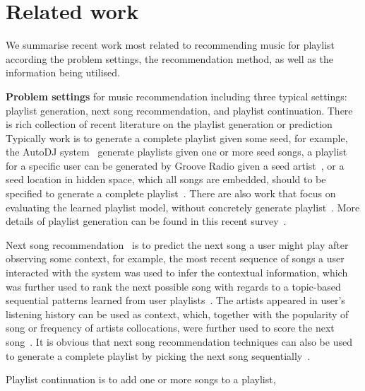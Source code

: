\section{Related work}
\label{sec:related}

We summarise recent work most related to recommending music for playlist
according the problem settings, the recommendation method,
as well as the information being utilised.


{\bf Problem settings} for music recommendation including three typical settings:
playlist generation, next song recommendation, and playlist continuation.
%
There is rich collection of recent literature on the playlist generation 
or prediction~\cite{platt2002learning,mcfee2011natural,mcfee2012hypergraph,chen2012playlist,ben2017groove} 
%
Typically work is to generate a complete playlist given some seed,
for example, the AutoDJ system~\cite{platt2002learning} generate playlists given one or more seed songs,
a playlist for a specific user can be generated by Groove Radio given a seed artist~\cite{ben2017groove},
or a seed location in hidden space, which all songs are embedded, 
should to be specified to generate a complete playlist~\cite{chen2012playlist}.
%
There are also work that focus on evaluating the learned playlist model, 
without concretely generate playlist~\cite{mcfee2011natural,mcfee2012hypergraph}.
More details of playlist generation can be found in this recent survey~\cite{bonnin2015automated}.


Next song recommendation~\cite{hariri2012context,bonnin2013evaluating,jannach2015beyond}
is to predict the next song a user might play after observing some context,
for example, the most recent sequence of songs a user interacted with the system was used to 
infer the contextual information, which was further used to rank the next possible song 
with regards to a topic-based sequential patterns learned from user playlists~\cite{hariri2012context}.
%
The artists appeared in user's listening history can be used as context, 
which, together with the popularity of song or frequency of artists collocations,
were further used to score the next song~\cite{mcfee2012million,bonnin2013evaluating}.
%
It is obvious that next song recommendation techniques can also be used to generate a 
complete playlist by picking the next song sequentially~\cite{bonnin2013evaluating,ben2017groove}.


Playlist continuation is to add one or more songs to a playlist, 


